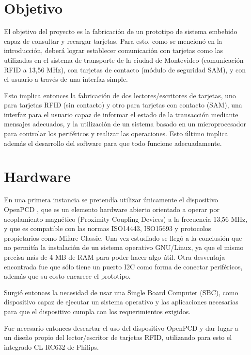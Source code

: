 \documentclass[%
        final,
        notitlepage,
        narroweqnarray,
        inline,
        ]{ieee}
\begin{document}
\section{Objetivo}
El objetivo del proyecto es la fabricación de un prototipo de sistema embebido capaz de consultar y recargar tarjetas. Para esto, como se mencionó en la introducción, deberá lograr establecer comunicación con tarjetas  como las utilizadas en el sistema de transporte de la ciudad de Montevideo (comunicación RFID a 13,56 MHz), con tarjetas de contacto (módulo de seguridad SAM), y con el usuario a través de una interfaz simple.


Esto implica entonces la fabricación de dos lectores/escritores de tarjetas, uno para tarjetas RFID (sin contacto) y
otro para tarjetas con contacto (SAM), una interfaz para el usuario capaz de informar el estado de la transacción
mediante mensajes adecuados, y la utilización de un sistema basado en un microprocesador para controlar los periféricos
y realizar las operaciones. Esto último implica además el desarrollo del software para que todo funcione adecuadamente.



\section{Hardware}
En una primera instancia se pretendía utilizar únicamente el dispositivo OpenPCD \cite{OpenPCD}, que es un elemento hardware abierto orientado a operar por acoplamiento magnético (Proximity Coupling Devices) a la frecuencia 13,56 MHz, y que es compatible con las normas ISO14443, ISO15693 y protocolos propietarios como Mifare Classic. Una vez estudiado se llegó a la conclusión que no permitía la instalación de un sistema operativo GNU/Linux, ya que el mismo precisa más de 4 MB de RAM para poder hacer algo útil. Otra desventaja encontrada fue que sólo tiene un puerto I2C como forma de conectar periféricos, además que su costo encarece el prototipo.

Surgió entonces la necesidad de usar una Single Board Computer (SBC), como dispositivo capaz de ejecutar un sistema operativo y las aplicaciones necesarias para que el dispositivo cumpla con los requerimientos exigidos.

Fue necesario entonces descartar el uso del dispositivo OpenPCD y dar lugar a un diseño propio del lector/escritor de tarjetas RFID, utilizando para esto el integrado CL RC632 de Philips.
\end{document}
